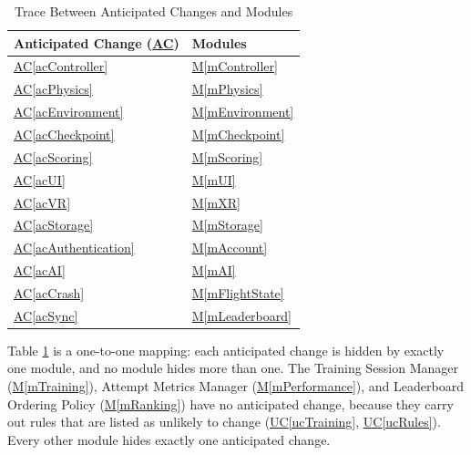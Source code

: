\documentclass[12pt, titlepage]{article}
\DeclareRobustCommand{\mgabbr}[2]{\hyperlink{mg-abbr:#1}{#2}}
\newcommand{\acref}[1]{\mgabbr{ac}{AC}\ref{#1}}
\newcommand{\uref}[1]{\mgabbr{uc}{UC}\ref{#1}}
\newcommand{\mref}[1]{\hyperref[#1]{M\ref*{#1}}}
\begin{document}

\begin{table}[H]
\centering
\renewcommand{\arraystretch}{1.2}

\begin{tabularx}{\textwidth}{p{} X}

\toprule
\textbf{Anticipated Change (\mgabbr{ac}{AC})}
& \textbf{Modules} \\
\midrule

\acref{acController}
& \mref{mController} \\

\acref{acPhysics}
& \mref{mPhysics} \\

\acref{acEnvironment}
& \mref{mEnvironment} \\

\acref{acCheckpoint}
& \mref{mCheckpoint} \\

\acref{acScoring}
& \mref{mScoring} \\

\acref{acUI}
& \mref{mUI} \\

\acref{acVR}
& \mref{mXR} \\

\acref{acStorage}
& \mref{mStorage} \\

\acref{acAuthentication}
& \mref{mAccount} \\

\acref{acAI}
& \mref{mAI} \\

\acref{acCrash}
& \mref{mFlightState} \\

\acref{acSync}
& \mref{mLeaderboard} \\

\bottomrule

\end{tabularx}

\caption{Trace Between Anticipated Changes and Modules}
\label{TblACT}
\end{table}

Table \ref{TblACT} is a one-to-one mapping: each anticipated change is
hidden by exactly one module, and no module hides more than one. The
Training Session Manager (\mref{mTraining}), Attempt Metrics Manager
(\mref{mPerformance}), and Leaderboard Ordering Policy (\mref{mRanking})
have no anticipated change, because they carry out rules that are listed
as unlikely to change (\uref{ucTraining}, \uref{ucRules}). Every
other module hides exactly one anticipated change.
\end{document}
